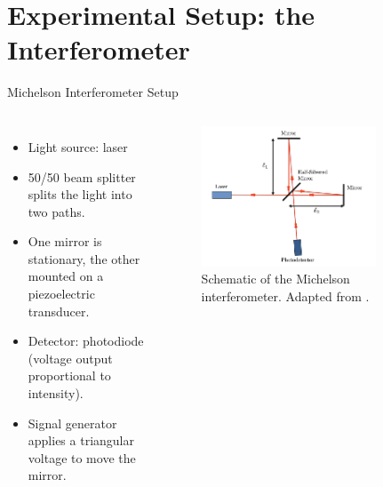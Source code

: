 \documentclass[aspectratio = 169]{beamer}
\begin{document}
\section{Experimental Setup: the Interferometer}
\begin{frame}{Michelson Interferometer Setup}
  \begin{columns}
      \begin{itemize}
        \item Light source: laser
        \item 50/50 beam splitter splits the light into two paths.
        \item One mirror is stationary, the other mounted on a piezoelectric transducer.
        \item Detector: photodiode (voltage output proportional to intensity).
        \item Signal generator applies a triangular voltage to move the mirror.
      \end{itemize}

      \begin{figure}
          \centering
          \includegraphics[width=0.8\textwidth]{fig/michelson_setup.png}
          \caption{Schematic of the Michelson interferometer. Adapted from \cite{MITOpticalInterferometry2023}.}
      \end{figure} 
  \end{columns}
\end{frame}
\end{document}
